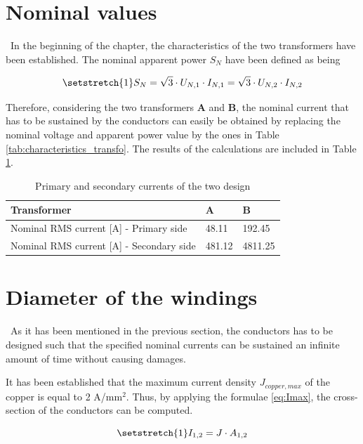 \documentclass[12pt,a4paper]{report}
\begin{document}
\section{Nominal values}
\quad\, In the beginning of the chapter, the characteristics of the two transformers have been established. The nominal apparent power $S_N$ have been defined as being

\begin{equation}
\setstretch{1}
    S_N = \sqrt{3}\cdot U_{N,1}\cdot I_{N,1} = \sqrt{3}\cdot U_{N,2}\cdot I_{N,2}
\end{equation}

Therefore, considering the two transformers \textbf{A} and \textbf{B}, the nominal current that has to be sustained by the conductors can easily be obtained by replacing the nominal voltage and apparent power value by the ones in Table \ref{tab:characteristics_transfo}. The results of the calculations are included in Table \ref{tab:currents}.

\begin{table}[h]
    \centering
    \begin{tabular}{l|ll}
    Transformer                                  & \textbf{A} & \textbf{B} \\ \hline
    Nominal RMS current [A] - Primary side   & 48.11                       & 192.45                      \\
    Nominal RMS current [A] - Secondary side & 481.12                      & 4811.25                    
    \end{tabular}
    \caption{Primary and secondary currents of the two design}
    \label{tab:currents}
\end{table}


\section{Diameter of the windings}
\quad\, As it has been mentioned in the previous section, the conductors has to be designed such that the specified nominal currents can be sustained an infinite amount of time without causing damages.

It has been established that the maximum current density $J_{copper,max}$ of the copper is equal to 2 A/mm$^2$. Thus, by applying the formulae \ref{eq:Imax}, the cross-section of the conductors can be computed.

 \begin{equation}
 \setstretch{1}
    I_{1,2} =  J \cdot A_{1,2}\label{eq:Imax}
\end{equation}
\end{document}
